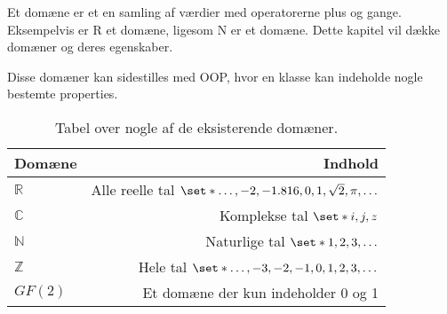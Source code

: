 Et domæne er et en samling af værdier med operatorerne plus og gange.
Eksempelvis er $\mathrm{R}$ et domæne, ligesom $ \mathrm{N}$ er et domæne.
Dette kapitel vil dække domæner og deres egenskaber.

Disse domæner kan sidestilles med OOP, hvor en klasse kan indeholde nogle bestemte properties.
\begin{table}[h]
    \centering
    \begin{tabular}{|l|r|}
        \hline
        Domæne & Indhold\\\hline
        $\mathbb{R}$ & Alle reelle tal $\set*{\dots,-2,-1.816,0,1,\sqrt{2},\pi,\dots}$\\
        $\mathbb{C}$ & Komplekse tal $\set*{i,j,z}$\\
        $\mathbb{N}$ & Naturlige tal $\set*{1,2,3,\dots}$\\
        $\mathbb{Z}$ & Hele tal $\set*{\dots,-3,-2,-1,0,1,2,3,\dots}$\\
        $GF(2)$ & Et domæne der kun indeholder 0 og 1\\
        \hline
    \end{tabular}
    \label{tab:fields}
    \caption{Tabel over nogle af de eksisterende domæner.}
\end{table}



